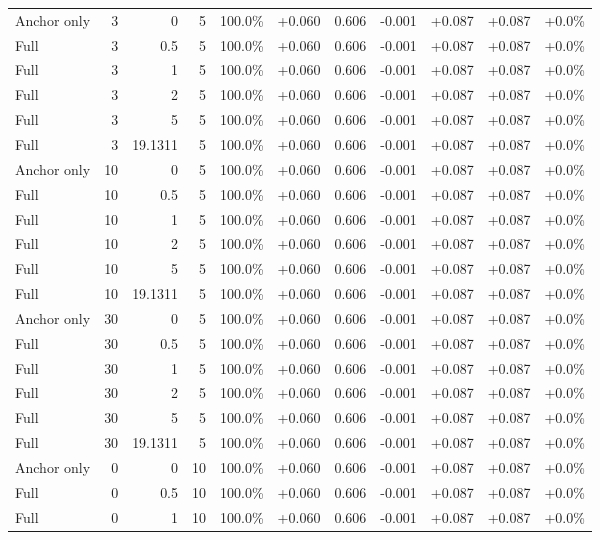 \begin{table}[htbp]
\begin{tabular}{lrrrccccccc}
Anchor only & 3 & 0 & 5 & 100.0\% & +0.060 & 0.606 & -0.001 & +0.087 & +0.087 & +0.0\% \\
Full & 3 & 0.5 & 5 & 100.0\% & +0.060 & 0.606 & -0.001 & +0.087 & +0.087 & +0.0\% \\
Full & 3 & 1 & 5 & 100.0\% & +0.060 & 0.606 & -0.001 & +0.087 & +0.087 & +0.0\% \\
Full & 3 & 2 & 5 & 100.0\% & +0.060 & 0.606 & -0.001 & +0.087 & +0.087 & +0.0\% \\
Full & 3 & 5 & 5 & 100.0\% & +0.060 & 0.606 & -0.001 & +0.087 & +0.087 & +0.0\% \\
Full & 3 & 19.1311 & 5 & 100.0\% & +0.060 & 0.606 & -0.001 & +0.087 & +0.087 & +0.0\% \\
Anchor only & 10 & 0 & 5 & 100.0\% & +0.060 & 0.606 & -0.001 & +0.087 & +0.087 & +0.0\% \\
Full & 10 & 0.5 & 5 & 100.0\% & +0.060 & 0.606 & -0.001 & +0.087 & +0.087 & +0.0\% \\
Full & 10 & 1 & 5 & 100.0\% & +0.060 & 0.606 & -0.001 & +0.087 & +0.087 & +0.0\% \\
Full & 10 & 2 & 5 & 100.0\% & +0.060 & 0.606 & -0.001 & +0.087 & +0.087 & +0.0\% \\
Full & 10 & 5 & 5 & 100.0\% & +0.060 & 0.606 & -0.001 & +0.087 & +0.087 & +0.0\% \\
Full & 10 & 19.1311 & 5 & 100.0\% & +0.060 & 0.606 & -0.001 & +0.087 & +0.087 & +0.0\% \\
Anchor only & 30 & 0 & 5 & 100.0\% & +0.060 & 0.606 & -0.001 & +0.087 & +0.087 & +0.0\% \\
Full & 30 & 0.5 & 5 & 100.0\% & +0.060 & 0.606 & -0.001 & +0.087 & +0.087 & +0.0\% \\
Full & 30 & 1 & 5 & 100.0\% & +0.060 & 0.606 & -0.001 & +0.087 & +0.087 & +0.0\% \\
Full & 30 & 2 & 5 & 100.0\% & +0.060 & 0.606 & -0.001 & +0.087 & +0.087 & +0.0\% \\
Full & 30 & 5 & 5 & 100.0\% & +0.060 & 0.606 & -0.001 & +0.087 & +0.087 & +0.0\% \\
Full & 30 & 19.1311 & 5 & 100.0\% & +0.060 & 0.606 & -0.001 & +0.087 & +0.087 & +0.0\% \\
Anchor only & 0 & 0 & 10 & 100.0\% & +0.060 & 0.606 & -0.001 & +0.087 & +0.087 & +0.0\% \\
Full & 0 & 0.5 & 10 & 100.0\% & +0.060 & 0.606 & -0.001 & +0.087 & +0.087 & +0.0\% \\
Full & 0 & 1 & 10 & 100.0\% & +0.060 & 0.606 & -0.001 & +0.087 & +0.087 & +0.0\% \\

\end{tabular}
\end{table}
